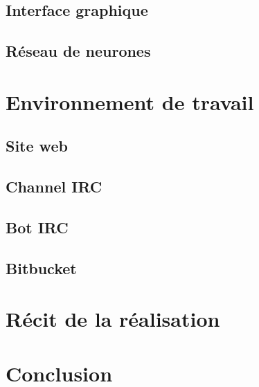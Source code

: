 \documentclass[12pt,a4paper]{article}
\begin{document}
\subsection{Interface graphique}

\newpage
\subsection{Réseau de neurones}

\newpage
\section{Environnement de travail}
\subsection{Site web}

\newpage
\subsection{Channel IRC}

\newpage
\subsection{Bot IRC}

\newpage
\subsection{Bitbucket}

\newpage
\section{Récit de la réalisation}

\newpage
\section{Conclusion}

\end{document}
